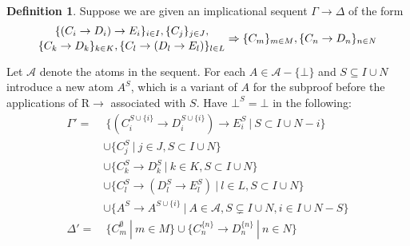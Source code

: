 \documentclass[a4paper,12pt]{article}
\theoremstyle{definition}
\theoremstyle{definition}
\theoremstyle{definition}
\theoremstyle{definition}
\theoremstyle{definition}
\newtheorem{definition}[theorem]{Definition}
\theoremstyle{definition}
\begin{document}
	\begin{definition}\label{translation}
		Suppose we are given an implicational sequent $\Gamma\to\Delta$ of the form $$\stackanchor{$\{(C_i\to D_i)\to E_i\}_{i\in I}, \{C_j\}_{j\in J},$}{$\{C_k\to D_k\}_{k\in K},\{C_l\to(D_l\to E_l)\}_{l\in L}$}\Rightarrow \{C_m\}_{m\in M}, \{C_n\to D_n\}_{n\in N}$$
		
		Let $\mathcal{A}$ denote the atoms in the sequent. For each $A\in\mathcal{A}-\{\bot\}$ and $S\subseteq I\cup N$ introduce a new atom $A^{S}$, which is a variant of $A$ for the subproof before the applications of R$\to$ associated with $S$. Have $\bot^S = \bot$ in the following:
		\begin{align*}
			\Gamma' = &\:\{(C_i^{S\cup \{i\}}\to D_i^{S\cup\{i\}})\to E_i^{S}\:|\: S\subset I\cup N - i\}
			\\&\cup \{C_{j}^S\:|\:j\in J, S\subset I\cup N\}
			\\&\cup \{C_{k}^S\to D_k^S\:|\:k\in K, S\subset I\cup N\}
			\\&\cup \{C_l^S\to(D_l^S\to E_l^S)\:|\: l\in L, S\subset I\cup N\}
			\\&\cup \{A^S\to A^{S\cup \{i\}}\:|\:A\in\mathcal{A}, S\subsetneq I\cup N, i\in I\cup N - S\}\\
			\Delta' = &\:\{C_m^\emptyset\:|\:m\in M\}\cup \{C_n^{\{n\}}\to D_n^{\{n\}}\:|\: n\in N\}
		\end{align*}
	\end{definition}
\end{document}
